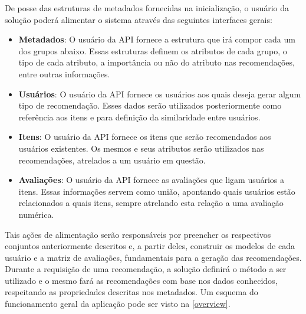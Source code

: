 \documentclass[12pt, openright, oneside, a4paper, brazil]{abntex2}
\begin{document}
De posse das estruturas de metadados fornecidas na inicialização, o usuário da solução poderá alimentar o sistema através das seguintes interfaces gerais:

\begin{itemize}

	\item \textbf{Metadados}: O usuário da API fornece a estrutura que irá compor cada um dos grupos abaixo. Essas estruturas definem os atributos de cada grupo, o tipo de cada atributo, a importância ou não do atributo nas recomendações, entre outras informações.

	\item \textbf{Usuários}: O usuário da API fornece os usuários aos quais deseja gerar algum tipo de recomendação. Esses dados serão utilizados posteriormente como referência aos itens e para definição da similaridade entre usuários.

	\item \textbf{Itens}: O usuário da API fornece os itens que serão recomendados aos usuários existentes. Os mesmos e seus atributos serão utilizados nas recomendações, atrelados a um usuário em questão.

	\item \textbf{Avaliações}: O usuário da API fornece as avaliações que ligam usuários a itens. Essas informações servem como união, apontando quais usuários estão relacionados a quais itens, sempre atrelando esta relação a uma avaliação numérica.

\end{itemize}

Tais ações de alimentação serão responsáveis por preencher os respectivos conjuntos anteriormente descritos e, a partir deles, construir os modelos de cada usuário e a matriz de avaliações, fundamentais para a geração das recomendações. Durante a requisição de uma recomendação, a solução definirá o método a ser utilizado e o mesmo fará as recomendações com base nos dados conhecidos, respeitando as propriedades descritas nos metadados. Um esquema do funcionamento geral da aplicação pode ser visto na \autoref{overview}.
\end{document}
